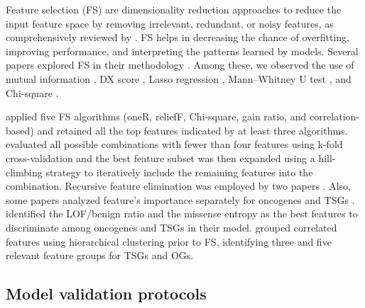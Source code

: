 Feature selection (FS) are dimensionality reduction approaches to reduce the input feature space by removing irrelevant, redundant, or noisy features, as comprehensively reviewed by \citet{li2017feature}. FS helps in decreasing the chance of overfitting, improving performance, and interpreting the patterns learned by models. Several papers explored FS in their methodology \cite{Carter2009, Tan2012, Davoli2013, Mao2013, U2014, Anoosha2015, Gnad2015, Park2015, Soliman2015, Dong2016, Park2017, Tavanaei2017, Agajanian2018, Guan2018, Zhou2018, Lyu2020, Nulsen2021}. Among these, we observed the use of mutual information \cite{Carter2009}, DX score \cite{Tan2012}, Lasso regression \cite{Davoli2013}, Mann–Whitney U test \cite{Mao2013}, and Chi-square \cite{Soliman2015}. 


\citet{U2014} applied five FS algorithms (\ie oneR, reliefF, Chi-square, gain ratio, and correlation-based) and retained all the top features indicated by at least three algorithms. \citet{Mao2013} evaluated all possible combinations with fewer than four features using k-fold cross-validation 
and the best feature subset was then expanded using a hill-climbing strategy to iteratively include the remaining features into the combination. Recursive feature elimination was employed by two papers \cite{Agajanian2018, Zhou2018}. Also, some papers analyzed feature's importance separately for oncogenes and TSGs \cite{Davoli2013, Gnad2015, Lyu2020}. \citet{Davoli2013} identified 
the LOF/benign ratio and the missense entropy as the best features to discriminate among oncogenes and TSGs in their model. 
\citet{Lyu2020} grouped correlated features using hierarchical clustering prior to FS, identifying three and five relevant feature groups for TSGs and OGs.

\subsection{Model validation protocols}

